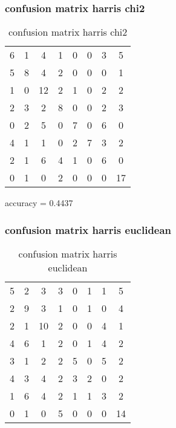 \documentclass[12pt]{article}
\begin{document}
\subsubsection{confusion matrix harris chi2}
\begin{table}[H]
\centering
\begin{tabular}{c c c c c c c c}
6 &     1 &     4 &     1 &     0 &     0 &     3 &     5 \\
5 &     8 &     4 &     2 &     0 &     0 &     0 &     1 \\
1 &     0 &    12 &     2 &     1 &     0 &     2 &     2 \\
2 &     3 &     2 &     8 &     0 &     0 &     2 &     3 \\
0 &     2 &     5 &     0 &     7 &     0 &     6 &     0 \\
4 &     1 &     1 &     0 &     2 &     7 &     3 &     2 \\
2 &     1 &     6 &     4 &     1 &     0 &     6 &     0 \\
0 &     1 &     0 &     2 &     0 &     0 &     0 &    17
\end{tabular}
\caption{confusion matrix harris chi2}
\label{table:harrischi2}
\end{table}

accuracy = 0.4437


\subsubsection{confusion matrix harris euclidean}
\begin{table}[H]
\centering
\begin{tabular}{c c c c c c c c}
5 &     2 &     3 &     3 &     0 &     1 &     1 &     5 \\
2 &     9 &     3 &     1 &     0 &     1 &     0 &     4 \\
2 &     1 &    10 &     2 &     0 &     0 &     4 &     1 \\
4 &     6 &     1 &     2 &     0 &     1 &     4 &     2 \\
3 &     1 &     2 &     2 &     5 &     0 &     5 &     2 \\
4 &     3 &     4 &     2 &     3 &     2 &     0 &     2 \\
1 &     6 &     4 &     2 &     1 &     1 &     3 &     2 \\
0 &     1 &     0 &     5 &     0 &     0 &     0 &    14 
\end{tabular}
\caption{confusion matrix harris euclidean}
\label{table:harriseuc}
\end{table}
\end{document}
